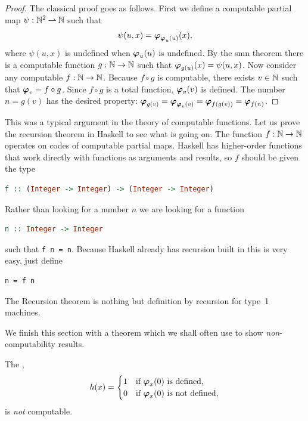 \begin{proof}
  The classical proof goes as follows. First we define a computable
  partial map $\psi : \mathbb{N}^2 \mathbin{\rightharpoonup} \mathbb{N}$ such that
  \begin{equation*}
    \psi(u, x) = \text{\boldmath{$\varphi$}}_{\text{\boldmath{$\varphi$}}_{u}(u)}(x),
  \end{equation*}
  where $\psi(u, x)$ is undefined when $\text{\boldmath{$\varphi$}}_{u}(u)$ is undefined.
  By the smn theorem there is a computable function $g : \mathbb{N} \to \mathbb{N}$
  such that $\text{\boldmath{$\varphi$}}_{g(u)}(x) = \psi(u, x)$. Now consider any computable
  $f : \mathbb{N} \to \mathbb{N}$. Because $f \circ g$ is computable, there exists
  $v \in \mathbb{N}$ such that $\text{\boldmath{$\varphi$}}_{v} = f \circ g$. Since $f \circ g$ is a
  total function, $\text{\boldmath{$\varphi$}}_{v}(v)$ is defined. The number $n = g(v)$ has
  the desired property:
  $\text{\boldmath{$\varphi$}}_{g(v)} = \text{\boldmath{$\varphi$}}_{\text{\boldmath{$\varphi$}}_{v}(v)} = \text{\boldmath{$\varphi$}}_{f(g(v))} = \text{\boldmath{$\varphi$}}_{f(n)}$.
\end{proof}

This was a typical argument in the theory of computable functions. Let
us prove the recursion theorem in Haskell to see what is going on. The
function $f : \mathbb{N} \to \mathbb{N}$ operates on codes of computable partial
maps. Haskell has higher-order functions that work directly with functions as arguments and results, so $f$ should be given the type
%
\begin{lstlisting}[language=Haskell]
f :: (Integer -> Integer) -> (Integer -> Integer)
\end{lstlisting}
%
Rather than looking for a number $n$ we are looking for a function
%
\begin{lstlisting}[language=Haskell]
n :: Integer -> Integer
\end{lstlisting}
%
such that \lstinline!f n = n!. Because Haskell already has recursion built in this is very easy, just define
%
\begin{lstlisting}
n = f n
\end{lstlisting}
%
The Recursion theorem is nothing but definition by recursion for type~1 machines.

We finish this section with a theorem which we shall often use to show
\emph{non}-computability results.

\begin{theorem}
  The ,
  \begin{equation*}
    h(x) =
    \begin{cases}
      1 & \text{if $\text{\boldmath{$\varphi$}}_{x}(0)$ is defined,}\\
      0 & \text{if $\text{\boldmath{$\varphi$}}_{x}(0)$ is not defined,}
    \end{cases}
  \end{equation*}
  is \emph{not} computable.
\end{theorem}

